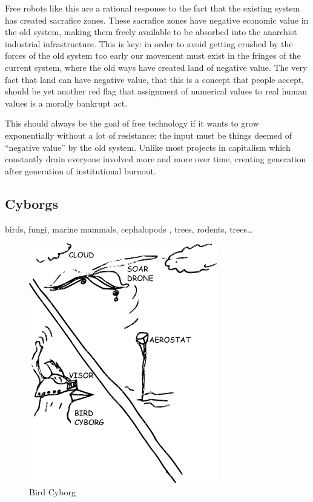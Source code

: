Free robots like this are a rational response to the fact that the
existing system has created sacrafice zones. These sacrafice zones have
negative economic value in the old system, making them freely available
to be absorbed into the anarchist industrial infrastructure. This is
key: in order to avoid getting crushed by the forces of the old system
too early our movement must exist in the fringes of the current system,
where the old ways have created land of negative value. The very fact
that land can have negative value, that this is a concept that people
accept, should be yet another red flag that assignment of numerical
values to real human values is a morally bankrupt act.

This should always be the goal of free technology if it wants to grow
exponentially without a lot of resistance: the input must be things
deemed of ``negative value'' by the old system. Unlike most projects in
capitalism which constantly drain everyone involved more and more over
time, creating generation after generation of institutional burnout.

\subsection{Cyborgs}\label{cyborgs}

birds, fungi, marine mammals, cephalopods , trees, rodents,
trees\ldots{}

\begin{figure}[htbp]
\centering
\includegraphics{images/birdcyborg.png}
\caption{Bird Cyborg}
\end{figure}

